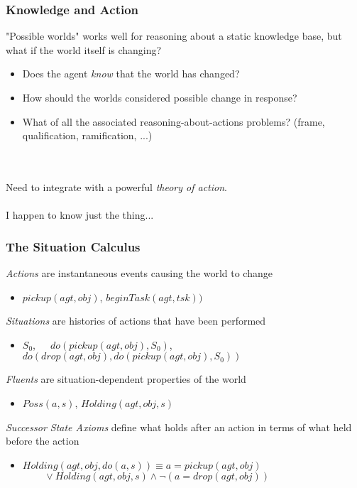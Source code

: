 \documentclass{beamer}
\begin{document}
\begin{frame}
\frametitle{Knowledge and Action}
"Possible worlds" works well for reasoning about a static knowledge base,
but what if the world itself is changing?
\begin{itemize}
\item  Does the agent \emph{know} that the world has changed?
\item  How should the worlds considered possible change in response?
\item  What of all the associated reasoning-about-actions problems? (frame, qualification, ramification, ...)
\end{itemize}
\ \\
\ \\
Need to integrate with a powerful \emph{theory of action}.
\pause
\ \\
\ \\
I happen to know just the thing...
\end{frame}

\begin{frame}
\frametitle{The Situation Calculus}
\emph{Actions} are instantaneous events causing the world to change
\begin{itemize}
  \item $pickup(agt,obj)$, $beginTask(agt,tsk))$
\end{itemize}
\emph{Situations} are histories of actions that have been performed
\begin{itemize}
  \item $S_0$,\ \ \ $do(pickup(agt,obj),S_0)$, $do(drop(agt,obj),do(pickup(agt,obj),S_0))$
\end{itemize}
\emph{Fluents} are situation-dependent properties of the world
\begin{itemize}
  \item $Poss(a,s)$, $Holding(agt,obj,s)$
\end{itemize}
\emph{Successor State Axioms} define what holds after an action in terms of what held before the action
\begin{itemize}
  \item $Holding(agt,obj,do(a,s)) \equiv a = pickup(agt,obj)$ \\
        $\,\,\,\,\,\,\,\,\,\,\,\,\,\vee Holding(agt,obj,s) \wedge \neg\left(a = drop(agt,obj)\right)$
\end{itemize}
\end{frame}
\end{document}
